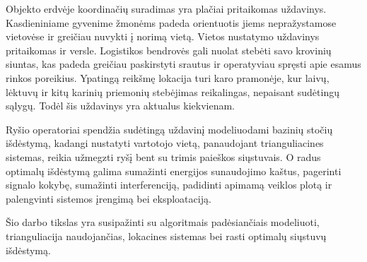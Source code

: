 
Objekto erdvėje koordinačių suradimas yra plačiai pritaikomas uždavinys.
Kasdieniniame gyvenime žmonėms padeda orientuotis jiems nepražystamose vietovėse ir greičiau nuvykti į norimą vietą.
Vietos nustatymo uždavinys pritaikomas ir versle. 
Logistikos bendrovės gali nuolat stebėti savo krovinių siuntas, kas padeda greičiau paskirstyti srautus ir operatyviau spręsti apie esamus rinkos poreikius.
Ypatingą reikšmę lokacija turi karo pramonėje, kur laivų, lėktuvų ir kitų karinių priemonių stebėjimas reikalingas, nepaisant sudėtingų sąlygų.
Todėl šis uždavinys yra aktualus kiekvienam.

\iffalse 
moksle (?)
\fi

Ryšio operatoriai spendžia sudėtingą uždavinį modeliuodami bazinių stočių išdėstymą, kadangi nustatyti vartotojo vietą, panaudojant trianguliacines sistemas, reikia užmegzti ryšį bent su trimis paieškos siųstuvais. O radus optimalų išdėstymą galima sumažinti energijos sunaudojimo kaštus, pagerinti signalo kokybę, sumažinti interferenciją, padidinti apimamą veiklos plotą ir palengvinti sistemos įrengimą bei eksploataciją.

Šio darbo tikslas yra susipažinti su algoritmais padėsiančiais modeliuoti, trianguliacija naudojančias, lokacines sistemas bei rasti optimalų siųstuvų išdėstymą.    

